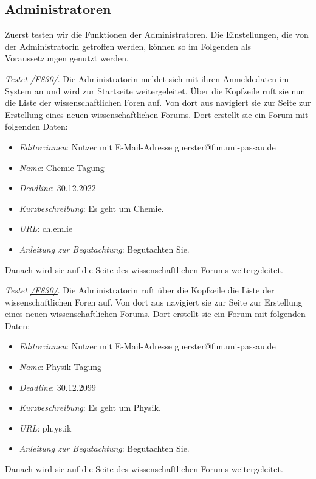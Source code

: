 \subsection{Administratoren}
Zuerst testen wir die Funktionen der Administratoren.
Die Einstellungen, die von der Administratorin getroffen werden, können so im Folgenden als Voraussetzungen genutzt werden.
\begin{description}

	 \emph{Testet \hyperref[funkt:830]{/F830/}}.
	Die Administratorin meldet sich mit ihren Anmeldedaten im System an und wird zur Startseite weitergeleitet.
	Über die Kopfzeile ruft sie nun die Liste der wissenschaftlichen Foren auf.
	Von dort aus navigiert sie zur Seite zur Erstellung eines neuen wissenschaftlichen Forums.
	Dort erstellt sie ein Forum mit folgenden Daten:
	\begin{itemize}
		\item \emph{Editor:innen}: Nutzer mit E-Mail-Adresse guerster@fim.uni-passau.de
		\item \emph{Name}: Chemie Tagung
		\item \emph{Deadline}: 30.12.2022
		\item \emph{Kurzbeschreibung}: Es geht um Chemie.
		\item \emph{URL}: ch.em.ie
		\item \emph{Anleitung zur Begutachtung}: Begutachten Sie.
	\end{itemize}
	Danach wird sie auf die Seite des wissenschaftlichen Forums weitergeleitet.

	 \emph{Testet \hyperref[funkt:830]{/F830/}}.
	Die Administratorin ruft über die Kopfzeile die Liste der wissenschaftlichen Foren auf.
	Von dort aus navigiert sie zur Seite zur Erstellung eines neuen wissenschaftlichen Forums.
	Dort erstellt sie ein Forum mit folgenden Daten:
	\begin{itemize}
		\item \emph{Editor:innen}: Nutzer mit E-Mail-Adresse guerster@fim.uni-passau.de
		\item \emph{Name}: Physik Tagung
		\item \emph{Deadline}: 30.12.2099
		\item \emph{Kurzbeschreibung}: Es geht um Physik.
		\item \emph{URL}: ph.ys.ik
		\item \emph{Anleitung zur Begutachtung}: Begutachten Sie.
	\end{itemize}
	Danach wird sie auf die Seite des wissenschaftlichen Forums weitergeleitet.

\end{description}

